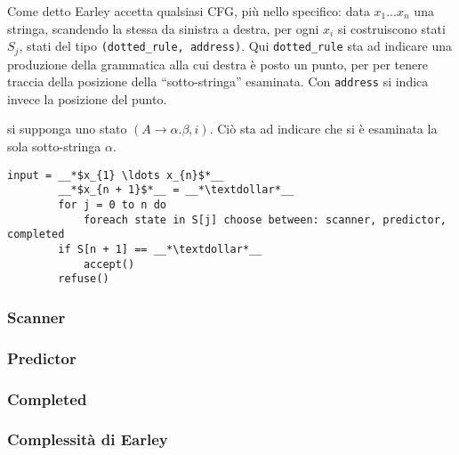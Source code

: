 \documentclass{subfiles}
\begin{document}
Come detto Earley accetta qualsiasi CFG, più nello specifico: data \(x_{1} \ldots x_{n}\) una stringa,
scandendo la stessa da sinistra a destra, per ogni \(x_{i}\) si costruiscono stati \(S_{j}\), stati del tipo \lstinline{(dotted_rule, address)}.
Qui \lstinline{dotted_rule} sta ad indicare una produzione della grammatica alla cui destra è posto un punto,
per per tenere traccia della posizione della ``sotto-stringa'' esaminata. Con \lstinline{address} si indica invece la posizione del punto.

\begin{Example*}
    si supponga uno stato \((A \to \alpha . \beta, i)\). Ciò sta ad indicare che si è esaminata la sola sotto-stringa \(\alpha\).
\end{Example*}

\begin{Algorithm*}[di Earley]\noindent
    \begin{lstlisting}[language = PSEUDO]
        input = __*$x_{1} \ldots x_{n}$*__
        __*$x_{n + 1}$*__ = __*\textdollar*__
        for j = 0 to n do
            foreach state in S[j] choose between: scanner, predictor, completed
        if S[n + 1] == __*\textdollar*__
            accept()
        refuse()
    \end{lstlisting}
\end{Algorithm*}

\subsubsection{Scanner}


\subsubsection{Predictor}


\subsubsection{Completed}


\subsubsection{Complessità di Earley}

\end{document}
